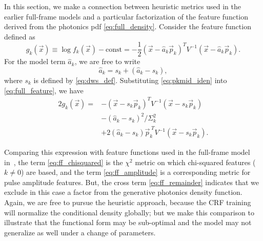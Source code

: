 \documentclass[10pt]{article}
\newcommand{\half}{\frac{1}{2}}
\newcommand{\crf}{{\small CRF}}
\newcommand{\tcrf}{Trace {\small CRF}}
\begin{document}
In this section, we make a connection between heuristic metrics used in the earlier full-frame models and a particular factorization of the feature function derived from the photonics pdf \eqref{eq:full_density}.
Consider the feature function defined as
\begin{equation}
g_k(\vec{x}) \equiv \log f_k(\vec{x}) - \mbox{const} = -\half (\vec{x}-\hat{a}_k\vec{p}_k)^T V^{-1} (\vec{x}-\hat{a}_k\vec{p}_k). \label{eq:full_feature}
\end{equation} 
For the model term $\hat{a}_k$, we are free to write
\begin{equation}
\hat{a}_k = s_k + (\hat{a}_k - s_k), \label{eq:pkmid_iden}
\end{equation}
where $s_k$ is defined by \eqref{eq:dws_def}.  Substituting \eqref{eq:pkmid_iden} into \eqref{eq:full_feature}, we have
\begin{subequations}
\label{eq:eq:ff_factored}
\begin{align}
2g_k(\vec{x}) = &-(\vec{x}-s_k\vec{p}_k)^T V^{-1} (\vec{x}-s_k\vec{p}_k) \label{eq:ff_chisquared}\\
						    &-(\hat{a}_k - s_k)^2/\Sigma_k^2 \label{eq:ff_amplitude}\\ %
						    &+ 2(\hat{a}_k - s_k) \vec{p}_k^{\;T} V^{-1} (\vec{x}-s_k\vec{p}_k). \label{eq:ff_remainder}
\end{align}
\end{subequations}

Comparing this expression with feature functions used in the full-frame model in~\cite{McClurg2009},
the term \eqref{eq:ff_chisquared} is the $\chi^2$ metric on which chi-squared features ($k\neq 0$) are based,
and the term \eqref{eq:ff_amplitude} is a corresponding metric for pulse amplitude features.
But, the cross term \eqref{eq:ff_remainder} indicates that we exclude in this case a factor from the generative photonics density function.
Again, we are free to pursue the heuristic approach, because the \crf{} training will normalize the conditional density globally; but we make this comparison to illustrate that the functional form may be sub-optimal and the model may not generalize as well under a change of parameters.
\end{document}
